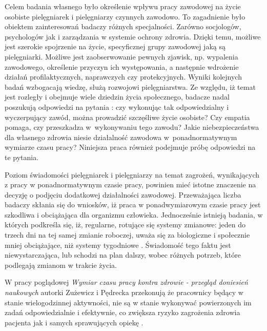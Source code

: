 \documentclass[a4paper,12pt,twoside,openright]{mwrep}
\begin{document}
Celem badania własnego było określenie wpływu pracy zawodowej na życie osobiste pielęgniarek i pielęgniarzy czynnych zawodowo. To zagadnienie było obiektem zainteresowań badaczy różnych specjalności. Zarówno socjologów, psychologów jak i zarządzania w systemie ochrony zdrowia.  Dzięki temu, możliwe jest szerokie spojrzenie na życie, specyficznej grupy zawodowej jaką są pielęgniarki. Możliwe jest zaobserwowanie pewnych zjawisk, np. wypalenia zawodowego, określenie przyczyn ich występowania, a następnie wdrożenie działań profilaktycznych, naprawczych czy protekcyjnych. Wyniki kolejnych badań wzbogacają wiedzę, służą rozwojowi pielęgniarstwa. Ze względu, iż temat jest rozległy i obejmuje wiele dziedzin życia społecznego, badacze nadal poszukują odpowiedzi na pytania : czy wykonując tak odpowiedzialny i wyczerpujący zawód, można prowadzić szczęśliwe życie osobiste? Czy empatia pomaga, czy przeszkadza w~wykonywaniu tego zawodu? Jakie niebezpieczeństwa dla własnego zdrowia niesie działalność zawodowa w~ponadnormatywnym wymiarze czasu pracy? Niniejsza praca również podejmuje próbę odpowiedzi na te pytania.

Poziom świadomości pielęgniarek i pielęgniarzy na temat zagrożeń, wynikających z pracy w ponadnormatywnym czasie pracy, powinien mieć istotne znaczenie na decyzję o podjęciu dodatkowej działalności zawodowej. Przeważająca liczba badaczy skłania się do wniosków, iż praca w ponadwymiarowym czasie pracy jest szkodliwa i obciążająca dla organizmu człowieka. Jednocześnie istnieją badania, w których podkreśla się, iż,  regularne, rotujące się systemy zmianowe: jeden do trzech dni na tej samej zmianie roboczej, uważa się za biologiczne i społecznie mniej obciążające, niż systemy tygodniowe \cite{konflikt}. Świadomość tego faktu  jest niewystarczająca, lub schodzi na plan dalszy, wobec różnych potrzeb, które podlegają zmianom w trakcie życia.



  W pracy poglądowej \textit{ Wymiar czasu pracy kontra zdrowie - przegląd doniesień naukowych} autorki Zużewicz i  Pędrecka przekonują że pracownicy będący w stanie wielogodzinnej aktywności, nie są w stanie wykonywać powierzonych im zadań odpowiedzialnie i efektywnie, co zwiększa ryzyko zagrożenia zdrowia pacjenta jak i samych sprawujących opiekę \cite{kontra}. 
\end{document}
